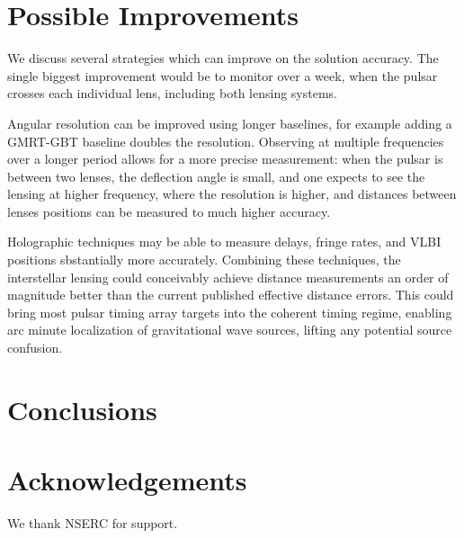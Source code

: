 \documentclass[useAMS,usenatbib]{mn2e}
\begin{document}
\section{Possible Improvements}

We discuss several strategies which can improve on the solution
accuracy.  The single biggest improvement would be to monitor over a
week, when the pulsar crosses each individual lens, including both
lensing systems.

Angular resolution can be improved using longer baselines, for example
adding a GMRT-GBT baseline doubles the resolution.  Observing at
multiple frequencies over a longer period allows for a more precise
measurement: when the pulsar is between two lenses, the deflection
angle is small, and one expects to see the lensing at higher
frequency, where the resolution is higher, and distances between
lenses positions can be measured to much higher accuracy.

Holographic techniques\citep{2008MNRAS.388.1214W,2014MNRAS.440L..36P}
may be able to measure delays, fringe rates, and VLBI positions
sbstantially more accurately.  Combining these techniques, the
interstellar lensing could conceivably achieve distance measurements
an order of magnitude better than the current published effective
distance errors.  This could bring most pulsar timing array targets
into the coherent timing regime, enabling arc minute localization of
gravitational wave sources, lifting any potential source confusion.

\section{Conclusions}



\section{Acknowledgements}

We thank NSERC for support.
\end{document}
